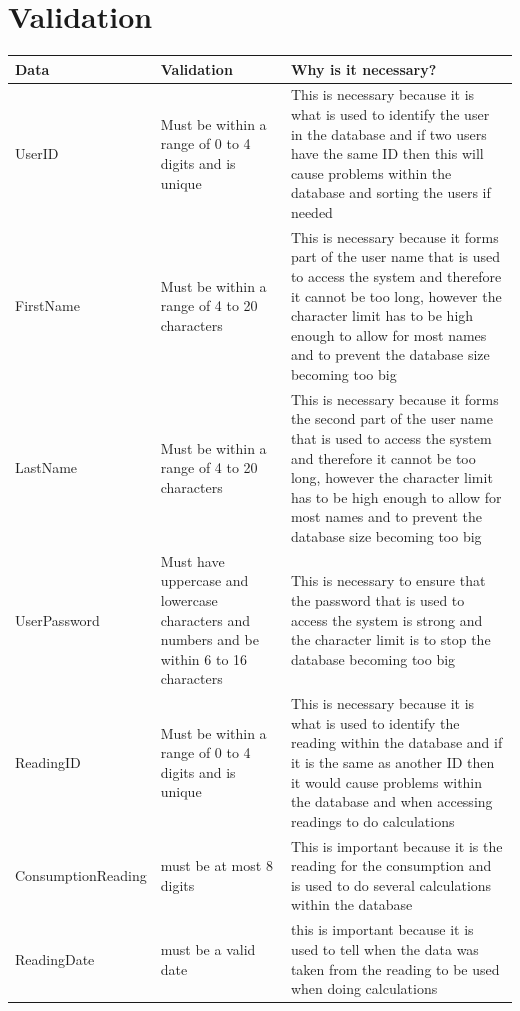 \section{Validation}
\begin{center}
    \begin{tabular}{|p{3cm}|p{5cm}|p{8cm}|}
        \hline
        \textbf{Data} & \textbf{Validation} & \textbf{Why is it necessary?}\\ \hline
        UserID & Must be within a range of 0 to 4 digits and is unique & This is necessary because it is what is used to identify the user in the database and if two users have the same ID then this will cause problems within the database and sorting the users if needed \\ \hline
        FirstName & Must be within a range of 4 to 20 characters & This is necessary because it forms part of the user name that is used to access the system and therefore it cannot be too long, however the character limit has to be high enough to allow for most names and to prevent the database size becoming too big \\ \hline
        LastName & Must be within a range of 4 to 20 characters &This is necessary because it forms the second part of the user name that is used to access the system and therefore it cannot be too long, however the character limit has to be high enough to allow for most names and to prevent the database size becoming too big \\ \hline
        UserPassword & Must have uppercase and lowercase characters and numbers and be within 6 to 16 characters & This is necessary to ensure that the password that is used to access the system is strong and the character limit is to stop the database becoming too big \\ \hline
        ReadingID & Must be within a range of 0 to 4 digits and is unique & This is necessary because it is what is used to identify the reading within the database and if it is the same as another ID then it would cause problems within the database and when accessing readings to do calculations \\ \hline
        ConsumptionReading &  must be at most 8 digits & This is important because it is the reading for the consumption and is used to do several calculations within the database \\ \hline
        ReadingDate & must be a valid date & this is important because it is used to tell when the data was taken from the reading to be used when doing calculations \\ \hline

\end{tabular}
\end{center}
